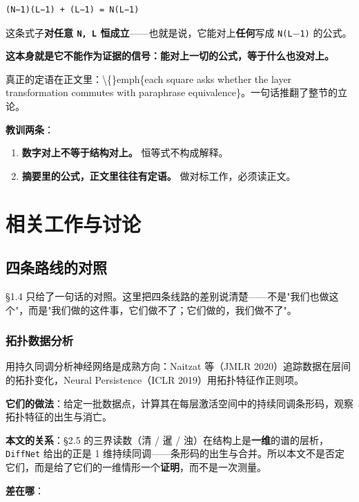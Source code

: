 \documentclass[11pt,a4paper]{ctexart}
\begin{document}
\begin{lstlisting}
(N−1)(L−1) + (L−1) = N(L−1)
\end{lstlisting}

这条式子\textbf{对任意 \texttt{N, L} 恒成立}——也就是说，它能对上\textbf{任何}写成 \texttt{N(L\ensuremath{-}1)} 的公式。

\textbf{这本身就是它不能作为证据的信号：能对上一切的公式，等于什么也没对上。}

真正的定语在正文里：\textbackslash\{\}emph\{each square asks whether the layer transformation commutes with paraphrase equivalence\}。一句话推翻了整节的立论。

\textbf{教训两条}：

\begin{enumerate}
\item \textbf{数字对上不等于结构对上。} 恒等式不构成解释。
\item \textbf{摘要里的公式，正文里往往有定语。} 做对标工作，必须读正文。
\end{enumerate}

\bigskip

\section{相关工作与讨论}

\subsection{四条路线的对照}

§1.4 只给了一句话的对照。这里把四条线路的差别说清楚——不是"我们也做这个"，而是"我们做的这件事，它们做不了；它们做的，我们做不了"。

\subsubsection{拓扑数据分析}

用持久同调分析神经网络是成熟方向：Naitzat 等（JMLR 2020）追踪数据在层间的拓扑变化，Neural Persistence（ICLR 2019）用拓扑特征作正则项。

\textbf{它们的做法}：给定一批数据点，计算其在每层激活空间中的持续同调条形码，观察拓扑特征的出生与消亡。

\textbf{本文的关系}：§2.5 的三界读数（清 / 暹 / 浊）在结构上是\textbf{一维}的谱的层析，\texttt{DiffNet} 给出的正是 1 维持续同调——条形码的出生与合并。所以本文不是否定它们，而是给了它们的一维情形一个\textbf{证明}，而不是一次测量。

\textbf{差在哪}：
\end{document}
